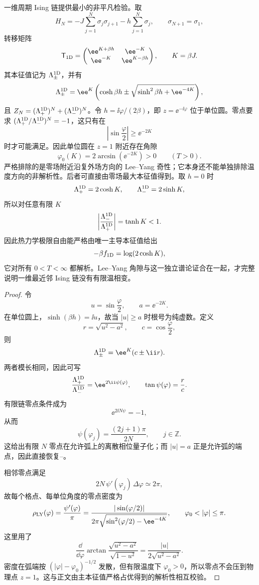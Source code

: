 一维周期 Ising 链提供最小的非平凡检验。取
\[
 H_N=-J\sum_{j=1}^{N}\sigma_j\sigma_{j+1}
 -h\sum_{j=1}^{N}\sigma_j,
 \qquad \sigma_{N+1}=\sigma_1,
\]
转移矩阵
\[
 \mathsf T_{\rm 1D}=
 \begin{pmatrix}
 \ee^{K+\beta h}&\ee^{-K}\\
 \ee^{-K}&\ee^{K-\beta h}
 \end{pmatrix},
 \qquad K=\beta J.
\]
其本征值记为 \(\Lambda_\pm^{\rm 1D}\)，并有
\[
 \Lambda_\pm^{\rm 1D}
 =\ee^K\left(
 \cosh\beta h
 \pm\sqrt{\sinh^2\beta h+\ee^{-4K}}
 \right),
\]
且 \(Z_N=(\Lambda_+^{\rm 1D})^N+(\Lambda_-^{\rm 1D})^N\)。令 \(h=\ii\varphi/(2\beta)\)，即 \(z=\ee^{-\ii\varphi}\) 位于单位圆。零点要求 \((\Lambda_+^{\rm 1D}/\Lambda_-^{\rm 1D})^N=-1\)，这只有在
\begin{equation}
 \left|\sin\frac{\varphi}{2}\right|
 \ge \ee^{-2K}
 \label{eq:phys-sm-1d-zero-gap-condition}
\end{equation}
时才可能满足。因此单位圆在 \(z=1\) 附近存在角隙
\begin{equation}
 \varphi_0(K)=2\arcsin(\ee^{-2K})>0
 \qquad (T>0).
 \label{eq:phys-sm-1d-gap-angle}
\end{equation}
 严格排除的是零场附近沿复外场方向的 Lee--Yang 奇性；它本身还不能单独排除温度方向的非解析性。后者可直接由零场最大本征值得到。取 \(h=0\) 时
\[
 \Lambda_+^{\rm 1D}=2\cosh K,
 \qquad
 \Lambda_-^{\rm 1D}=2\sinh K,
\]
所以对任意有限 \(K\)
\[
 \left|\frac{\Lambda_-^{\rm 1D}}{\Lambda_+^{\rm 1D}}\right|
 =\tanh K<1.
\]
因此热力学极限自由能严格由唯一主导本征值给出
\begin{equation}
 -\beta f_{\rm 1D}=\log(2\cosh K),
 \label{eq:phys-sm-1d-free-energy}
\end{equation}
它对所有 \(0<T<\infty\) 都解析。Lee--Yang 角隙与这一独立谱论证合在一起，才完整说明一维最近邻 Ising 链没有有限温相变。

\begin{proof}
令
\[
 u=\sin\frac{\varphi}{2},
 \qquad
 a=\ee^{-2K}.
\]
在单位圆上，\(\sinh(\beta h)=\ii u\)，故当 \(|u|\ge a\) 时根号为纯虚数。定义
\[
 r=\sqrt{u^2-a^2},
 \qquad
 c=\cos\frac{\varphi}{2},
\]
则
\[
 \Lambda_\pm^{\rm 1D}=\ee^K(c\pm\ii r).
\]
两者模长相同，因此可写
\[
 \frac{\Lambda_+^{\rm 1D}}{\Lambda_-^{\rm 1D}}
 =\ee^{2\ii\psi(\varphi)},
 \qquad
 \tan\psi(\varphi)=\frac{r}{c}.
\]
有限链零点条件成为
\[
 \ee^{2\ii N\psi}=-1,
\]
从而
\[
 \psi(\varphi_j)=\frac{(2j+1)\pi}{2N},
 \qquad j\in\mathbb Z.
\]
这给出有限 \(N\) 零点在允许弧上的离散相位量子化；而 \(|u|=a\) 正是允许弧的端点，因此直接恢复--。

相邻零点满足
\[
 2N\,\psi'(\varphi_j)\,\Delta\varphi\simeq2\pi,
\]
故每个格点、每单位角度的零点密度为
\[
 \rho_{\rm LY}(\varphi)
 =\frac{\psi'(\varphi)}{\pi}
 =\frac{|\sin(\varphi/2)|}
 {2\pi\sqrt{\sin^2(\varphi/2)-\ee^{-4K}}},
 \qquad \varphi_0<|\varphi|\le\pi .
\]
这里用了
\[
 \frac{\dd}{\dd\varphi}
 \arctan\!\frac{\sqrt{u^2-a^2}}{\sqrt{1-u^2}}
 =\frac{|u|}{2\sqrt{u^2-a^2}}.
\]
密度在弧端按 \((|\varphi|-\varphi_0)^{-1/2}\) 发散，但有限温度下
\(\varphi_0>0\)，所以零点不会压到物理点 \(z=1\)。这与正文由主本征值严格占优得到的解析性相互校验。
\end{proof}


